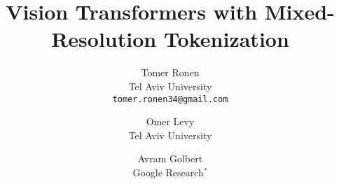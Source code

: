 \documentclass[10pt,twocolumn,letterpaper]{article}
\begin{document}
\title{Vision Transformers with Mixed-Resolution Tokenization}

\author{
Tomer Ronen\\
Tel Aviv University\\
{\tt\small tomer.ronen34@gmail.com}
\and
Omer Levy\\
Tel Aviv University\\
\and
Avram Golbert\\
Google Research$^\text{*}$
}
\maketitle









\clearpage

{\small


}

\clearpage


\end{document}
